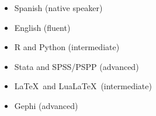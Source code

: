 




\twocolumnsection
{
\begin{itemize}
\vspace{1em}
	\item Spanish (native speaker)
	\item English (fluent)
\end{itemize}}
{
\vspace{1em}
\begin{itemize}
        \item R and Python (intermediate)
	\item Stata and SPSS/PSPP (advanced)
	\item \LaTeX\ and Lua\LaTeX\ (intermediate)
    \item Gephi (advanced)
\end{itemize}
}
\\